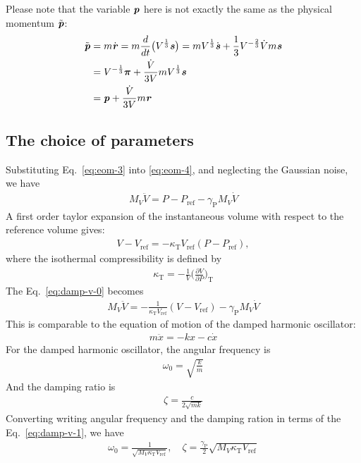 \documentclass[aps, pre, preprint,unsortedaddress,a4paper,onecolumn]{revtex4}
\newcommand{\vect}[1]{\textbf{\textit{#1}}}
\newcommand{\mypi}{\boldsymbol\pi}
\newcommand{\target}{\textrm{ref}}
\newcommand{\temp}[0]{{\textrm{T}}}
\newcommand{\pres}[0]{{\textrm{P}}}
\begin{document}
Please note that the variable $\vect p$ here is not exactly the same as the physical momentum $\tilde {\vect p}$:
\begin{align}\nonumber
  \tilde {\vect p}
  &= m \dot{\vect r}
  = m \frac{d}{dt}\big(V^{\frac13}\vect s\big)
  = m V^{\frac13}\dot{\vect s} + \frac13 V^{-\frac23}\dot Vm\vect s \\\nonumber
  & =
  V^{-\frac13}\mypi + \frac{\dot V}{3V}m V^{\frac13}\vect s \\
  &=
  \vect p + \frac{\dot V}{3V}m\vect r
\end{align}

\subsection{The choice of parameters}
Substituting Eq.~\eqref{eq:eom-3} into \eqref{eq:eom-4}, and neglecting the
Gaussian noise, we have
\begin{align}\label{eq:damp-v-0}
  M_V \ddot V = P - P_\target - \gamma_\pres M_V \dot V 
\end{align}
A first order taylor expansion of the instantaneous volume with respect to the
reference volume gives:
\begin{align}
  V - V_\target = -\kappa_\temp V_\target (P - P_\target),
\end{align}
where the isothermal compressibility is defined by
\begin{align}
  \kappa_\temp =-\frac 1V \Big(\frac{\partial V}{\partial P}\Big)_\temp
\end{align}
The Eq.~\eqref{eq:damp-v-0} becomes
\begin{align}\label{eq:damp-v-1}
  M_V \ddot V = -\frac{1}{\kappa_\temp V_\target}(V - V_\target) - \gamma_\pres M_V \dot V
\end{align}
This is comparable to the equation of motion of the damped harmonic oscillator:
\begin{align}
  m\ddot x = -kx - c\dot x
\end{align}
For the damped harmonic oscillator, the angular frequency is
\begin{align}
  \omega_0 = \sqrt{\frac km}
\end{align}
And the damping ratio is
\begin{align}
  \zeta = \frac{c}{2\sqrt{mk}}
\end{align}
Converting writing angular frequency and the damping ration in terms of the
Eq.~\eqref{eq:damp-v-1}, we have
\begin{align}
  \omega_0 = \frac{1}{\sqrt{M_V \kappa_\temp V_\target}}, \quad
  \zeta = \frac{\gamma_\pres}{2}\sqrt{M_V\kappa_\temp V_\target}
\end{align}
\end{document}
